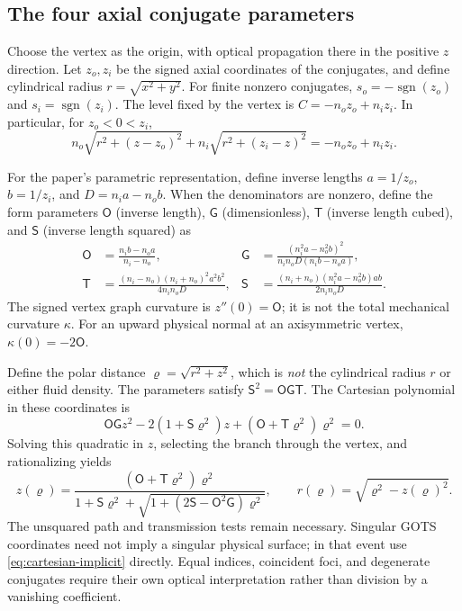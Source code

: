 \subsection{The four axial conjugate parameters}
Choose the vertex as the origin, with optical propagation there in the positive
$z$ direction. Let $z_o,z_i$ be the signed axial coordinates of the conjugates,
and define cylindrical radius $r=\sqrt{x^2+y^2}$. For finite nonzero conjugates,
$s_o=-\operatorname{sgn}(z_o)$ and $s_i=\operatorname{sgn}(z_i)$. The level fixed
by the vertex is $C=-n_oz_o+n_iz_i$. In particular, for $z_o<0<z_i$,
\begin{equation}
 n_o\sqrt{r^2+(z-z_o)^2}+n_i\sqrt{r^2+(z_i-z)^2}
 =-n_oz_o+n_iz_i.
 \label{eq:real-cartesian}
\end{equation}

For the paper's parametric representation, define inverse lengths
$a=1/z_o$, $b=1/z_i$, and $D=n_i a-n_o b$. When the denominators are nonzero,
define the form parameters $\mathsf O$ (inverse length), $\mathsf G$
(dimensionless), $\mathsf T$ (inverse length cubed), and $\mathsf S$ (inverse
length squared) as
\begin{align}
 \mathsf O&=\frac{n_i b-n_o a}{n_i-n_o}, &
 \mathsf G&=\frac{(n_i^2a-n_o^2b)^2}{n_i n_o D(n_i b-n_o a)},\label{eq:gots-a}\\
 \mathsf T&=\frac{(n_i-n_o)(n_i+n_o)^2a^2b^2}{4n_i n_oD}, &
 \mathsf S&=\frac{(n_i+n_o)(n_i^2a-n_o^2b)ab}{2n_i n_oD}.
 \label{eq:gots-b}
\end{align}
The signed vertex graph curvature is $z''(0)=\mathsf O$; it is not the total
mechanical curvature $\kappa$. For an upward physical normal at an axisymmetric
vertex, $\kappa(0)=-2\mathsf O$.

Define the polar distance $\varrho=\sqrt{r^2+z^2}$, which is \emph{not} the
cylindrical radius $r$ or either fluid density. The parameters satisfy
$\mathsf S^2=\mathsf O\mathsf G\mathsf T$. The Cartesian polynomial in these
coordinates is
\begin{equation}
 \mathsf O\mathsf Gz^2-2(1+\mathsf S\varrho^2)z
       +(\mathsf O+\mathsf T\varrho^2)\varrho^2=0.
 \label{eq:gots-polynomial}
\end{equation}
Solving this quadratic in $z$, selecting the branch through the vertex, and
rationalizing yields
\begin{equation}
 z(\varrho)=
 \frac{(\mathsf O+\mathsf T\varrho^2)\varrho^2}
 {1+\mathsf S\varrho^2+
   \sqrt{1+(2\mathsf S-\mathsf O^2\mathsf G)\varrho^2}},\qquad
 r(\varrho)=\sqrt{\varrho^2-z(\varrho)^2}.
 \label{eq:gots-parametric}
\end{equation}
The unsquared path and transmission tests remain necessary. Singular GOTS
coordinates need not imply a singular physical surface; in that event use
\cref{eq:cartesian-implicit} directly. Equal indices, coincident foci, and
degenerate conjugates require their own optical interpretation rather than
division by a vanishing coefficient.

